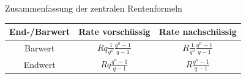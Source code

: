 \begin{frame}{Zusammenfassung der zentralen Rentenformeln}
	\begin{tabular}{|c||c|c|}
			\hline End-/Barwert & Rate vorschüssig & Rate nachschüssig \\ \hline
			\hline Barwert& $Rq\frac{1}{q^n}\frac{q^n -1}{q-1}$ & $R\frac{1}{q^n}\frac{q^n -1}{q-1}$ \\ 
			\hline Endwert & $Rq\frac{q^n -1}{q-1}$ & $R\frac{q^n -1}{q-1}$ \\ 
			\hline 
		\end{tabular}
\end{frame}

